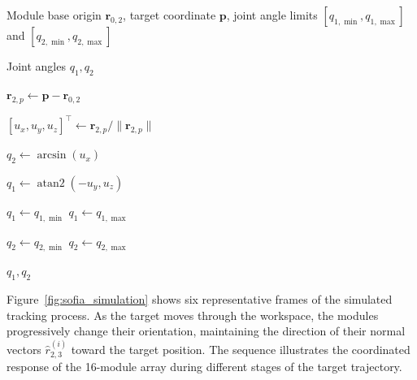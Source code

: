 \documentclass[lettersize,journal]{IEEEtran}
\begin{document}
\begin{algorithm}[H]
\caption{SOFIA Module Inverse Kinematics}
\label{alg:sofia_ik}

\begin{algorithmic}[1]

\Require Module base origin $\mathbf{r}_{0,2}$, target coordinate
$\mathbf{p}$, joint angle limits
$[q_{1,\min},q_{1,\max}]$ and
$[q_{2,\min},q_{2,\max}]$

\Ensure Joint angles $q_1,q_2$

\State $\mathbf{r}_{2,p} \gets \mathbf{p} - \mathbf{r}_{0,2}$

\State $[u_x,u_y,u_z]^\top \gets
\mathbf{r}_{2,p}/\lVert\mathbf{r}_{2,p}\rVert$

\State $q_2 \gets \arcsin(u_x)$

\State $q_1 \gets \operatorname{atan2}(-u_y,u_z)$

    \State $q_1 \gets q_{1,\min}$
    \State $q_1 \gets q_{1,\max}$
\EndIf

    \State $q_2 \gets q_{2,\min}$
    \State $q_2 \gets q_{2,\max}$
\EndIf

\State \Return $q_1,q_2$

\end{algorithmic}
\end{algorithm}

Figure~\ref{fig:sofia_simulation} shows six representative frames
of the simulated tracking process. As the target moves through the
workspace, the modules progressively change their orientation,
maintaining the direction of their normal vectors
$\hat{r}_{2,3}^{(i)}$ toward the target position. The sequence
illustrates the coordinated response of the 16-module array during
different stages of the target trajectory.
\end{document}
